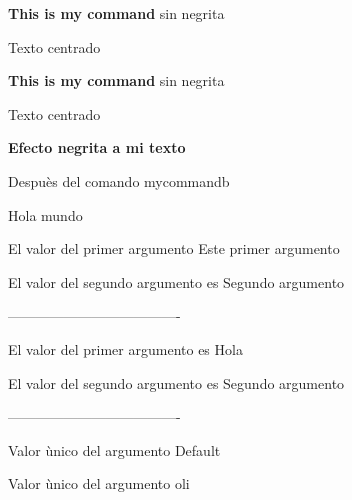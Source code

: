 \documentclass{article}
\begin{document}
\newcommand{\mycommand}{\textbf{This is my command} sin negrita

\begin{center}
  Texto centrado
\end{center}
}
\mycommand

\mycommand

\newcommand{\mycommandb}[1]{\begingroup\bfseries #1\endgroup}

\mycommandb{Efecto negrita a mi texto}

Despuès del comando mycommandb

\mycommandb{
  \begin{center}
    Hola mundo
  \end{center}
}

\newcommand{\mycommandc}[2]{
  El valor del primer argumento #1

  El valor del segundo argumento es #2
}

\mycommandc{Este primer argumento}{Segundo argumento}

-------------------------------------

\newcommand{\mycommandd}[2][Valor por defecto]{
  El valor del primer argumento es #1

  El valor del segundo argumento es #2

}

\mycommandd[Hola]{Segundo argumento}

-------------------------------------
\newcommand{\mycommande}[1][Default]{
  Valor ùnico del argumento #1
}

\mycommande
\mycommande[oli]
\end{document}
